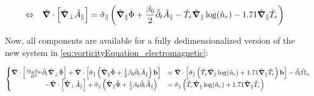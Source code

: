 \begin{align}
	&\Leftrightarrow&
	\hat{\grad}\cdot\left[\hat{\grad}_\perp \hat{A}_\parallel\right]
	&= \hat{\sigma}_\parallel\left(
	\hat{\grad}_\parallel\hat{\Phi}
	+ \frac{\beta_0}{2}\hat{\partial}_t\hat{A}_\parallel
	- \hat{T}_e\hat{\grad}_\parallel\log(\hat{n}_e)
	- 1.71\hat{\grad}_\parallel \hat{T}_e\right) \nonumber		
\end{align}

Now, all components are available for a fully dedimensionalized version of the new system in \autoref{eq:vorticityEquation_electromagnetic}: 

\begin{align}
	\label{eq:vorticityEquation_electromagnetic_dedimensionalized}
	\begin{cases}
		\hat{\grad}\cdot\left[\frac{\hat{m}_\alpha \hat{n}_\alpha}{ \hat{B}^2}\hat{\partial}_t\hat{\grad}_\perp\hat{\Phi}\right] + \hat{\grad}\cdot\left[\hat{\sigma}_\parallel\left(\hat{\grad}_\parallel\hat{\Phi}+ \frac{1}{2}\beta_0\hat{\partial}_t\hat{A}_\parallel\right)\mathbf{b}\right]
		&= \hat{\grad}\cdot\left[\hat{\sigma}_\parallel\left(
		\hat{T}_e\hat{\grad}_\parallel\log(\hat{n}_e) + 1.71\hat{\grad}_\parallel \hat{T}_e
		\right)\mathbf{b}\right]-\hat{\partial}_t \hat{\Omega}_\pi \\
		\qquad\qquad\quad-\hat{\grad}\cdot\left[\hat{\grad}_\perp \hat{A}_\parallel\right]
		+ \hat{\sigma}_\parallel\left(\hat{\grad}_\parallel\hat{\Phi}
		+ \frac{1}{2}\beta_0\hat{\partial}_t\hat{A}_\parallel\right) &= \hat{\sigma}_\parallel\left(
		\hat{T}_e\hat{\grad}_\parallel\log(\hat{n}_e) + 1.71\hat{\grad}_\parallel \hat{T}_e
		\right)
	\end{cases}
\end{align}

